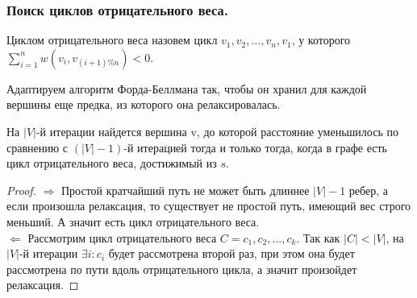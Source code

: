 \documentclass[a4paper,14pt]{article}
\begin{document}
    \subsubsection*{Поиск циклов отрицательного веса.}
    \label{subsubsec:ford_bellman_negative_cycle}
    \begin{problem}
        Циклом отрицательного веса назовем цикл $v_1, v_2, \ldots, v_n, v_1$, у которого $\sum\limits_{i=1}^{n} w(v_i, v_{(i+1)\%n}) < 0$.
    \end{problem}
    Адаптируем алгоритм Форда-Беллмана так, чтобы он хранил для каждой вершины еще предка, из которого она релаксировалась.
    \begin{prop}
        На $|V|$-й итерации найдется вершина v, до которой расстояние
    уменьшилось по сравнению с $(|V| - 1)$-й итерацией тогда и только
    тогда, когда в графе есть цикл отрицательного веса, достижимый
    из $s$.
    \end{prop}
    \begin{proof}
        $\Rightarrow$ Простой кратчайший путь не может быть длиннее $|V|-1$
        ребер, а если произошла релаксация, то существует не простой
        путь, имеющий вес строго меньший. А значит есть цикл
        отрицательного веса. \\
        $\Leftarrow$ Рассмотрим цикл отрицательного веса $C = c_1, c_2, \ldots, c_k$. Так как
        $|C| < |V|$, на $|V|$-й итерации $\exists i : c_i$ будет рассмотрена второй
        раз, при этом она будет рассмотрена по пути вдоль
        отрицательного цикла, а значит произойдет релаксация.
    \end{proof}
    
\end{document}
